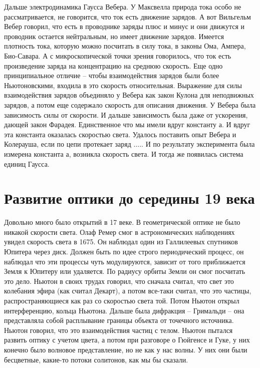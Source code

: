\documentclass[a4paper, 12pt]{article}
\begin{document}
Дальше электродинамика Гаусса Вебера. У Максвелла природа тока особо не 
рассматривается, не говорится, что ток есть движение зарядов. А вот 
Вильгельм Вебер говорил, что есть в проводнике заряды плюс и минус и они 
движутся и проводник остается нейтральным, но имеет движение зарядов. 
Имеется плотность тока, которую можно посчитать в силу тока, в законы 
Ома, Ампера, Био-Савара. А с микроскопической точки зрения говорилось, 
что ток есть произведение заряда на концентрацию на среднюю скорость. 
Еще одно принципиальное отличие -- чтобы взаимодействия зарядов были 
более Ньютоновскими, входила в это скорость относительная. Выражение для 
силы взаимодействия зарядов объединяло у Вебера как закон Кулона для 
неподвижных зарядов, а потом еще содержало скорость для описания 
движения. У Вебера была зависимость силы от скорости. И дальше 
зависимость была даже от ускорения, дающей закон Фарадея. Единственное 
что мы имели вдруг константу а. И вдруг эта константа оказалась 
скоростью света. Удалось поставить опыт Вебера и Колерауша, если по цепи 
протекает заряд ..... И по результату эксперимента была измерена 
константа а, возникла скорость света. И тогда же появилась система 
единиц Гаусса.


\section{Развитие оптики до середины 19 века}

Довольно много было открытий в 17 веке. В геометрической оптике не было 
никакой скорости света. Олаф Ремер смог в астрономических наблюдениях 
увидел скорость света в 1675. Он наблюдал один из Галлилеевых спутников 
Юпитера через диск. Должен быть по идее строго периодический процесс, он 
наблюдал что эти процессы чуть модулируются, зависит от того 
приближается Земля к Юпитеру или удаляется. По радиусу орбиты Земли он 
смог посчитать это дело. Ньютон в своих трудах говорил, что сначала 
считал, что свет это колебания эфира (как считал Декарт), а потом 
все-таки считал, что это частицы, распространяющиеся как раз со 
скоростью света той. Потом Ньютон открыл интерференцию, кольца Ньютона. 
Дальше была дифракция -- Гримальди -- она представляла собой расплывание 
границы объекта от точечного источника. Ньютон говорил, что это 
взаимодействия частиц с телом. Ньютон пытался развить оптику с учетом 
цвета, а потом при разговоре о Гюйгенсе и Гуке, у них конечно было 
волновое представление, но не как у нас волны. У них они были 
бесцветные, какие-то потоки солитонов, как мы бы сказали.
\end{document}
